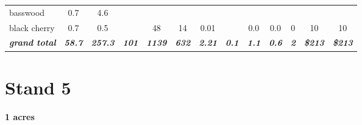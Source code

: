 \documentclass[landscape]{article}
\begin{document}
\begin{table}[H]
\begin{tabular}[t]{lcccccccccccc}
\rowcolor{gray!6}  basswood & 0.7 & 4.6 &  &  &  &  &  &  &  &  &  & \\
 
black cherry & 0.7 & 0.5 &  & 48 & 14 & 0.01 &  & 0.0 & 0.0 & 0 & 10 & 10\\
 
\rowcolor{gray!6}  \rowcolor[HTML]{DCDCDC}  \em{\textbf{grand total}} & \em{\textbf{58.7}} & \em{\textbf{257.3}} & \em{\textbf{101}} & \em{\textbf{1139}} & \em{\textbf{632}} & \em{\textbf{2.21}} & \em{\textbf{0.1}} & \em{\textbf{1.1}} & \em{\textbf{0.6}} & \em{\textbf{2}} & \em{\textbf{\$213}} & \em{\textbf{\$213}}\\
\bottomrule
\end{tabular}
\end{table}

\pagebreak

\section{Stand 5}\label{stand-5}

\textbf{1 acres}
\end{document}
